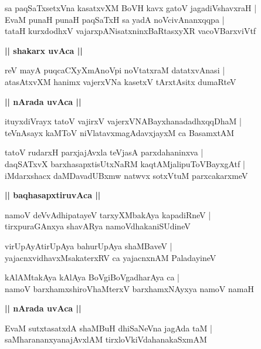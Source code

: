 \documentclass[twoside,12pt,openright]{book}
\newcounter{shloka}[chapter]
\def\uvaca#1{\centerline{{\large\textbf{#1}}}}
\begin{document}
\begin{shloka}%
sa paqSaTxsetxVna kasatxvXM BoVH kavx gatoV jagadiVshavxraH |\\
EvaM punaH punaH paqSaTxH sa yadA noVcivAnanxqqpa |\\
tataH kurxdodhxV vajarxpANisatxninxBaRtasxyXR vacoVBarxviVtf 
\end{shloka}

\uvaca{|| shakarx uvAca ||}

\begin{shloka}%
reV mayA puqcaCXyXmAnoVpi noVtatxraM datatxvAnasi |\\
atasAtxvXM hanimx vajerxVNa kasetxV tArxtAsitx dumaRteV 
\end{shloka}

\uvaca{|| nArada uvAca ||}

\begin{shloka}%
ituyxdiVrayx tatoV vajirxV vajerxVNABayxhanadadhxqqDhaM |\\
teVnAsayx kaMToV niVlatavxmagAdavxjayxM ca BasamxtAM 
\end{shloka}

\begin{shloka}%
tatoV rudarxH parxjajAvxla teVjasA parxdahaninxva |\\
daqSATxvX barxhasapxtisUtxNaRM kaqtAMjalipuToVBayxgAtf |\\
iMdarxshacx daMDavadUBxmw natwvx sotxVtuM parxcakarxmeV
\end{shloka}

\uvaca{|| baqhasapxtiruvAca ||}

\begin{shloka}%
namoV deVvAdhipatayeV tarxyXMbakAya kapadiRneV |\\
tirxpuraGAnxya shavARya namoVdhakaniSUdineV 
\end{shloka}

\begin{shloka}%
virUpAyAtirUpAya bahurUpAya shaMBaveV |\\
yajacnxvidhavxMsakaterxRV ca yajacnxnAM PaladayineV 
\end{shloka}

\begin{shloka}%
kAlAMtakAya kAlAya BoVgiBoVgadharAya ca |\\
namoV barxhamxshiroVhaMterxV barxhamxNAyxya namoV namaH 
\end{shloka}

\uvaca{|| nArada uvAca ||}

\begin{shloka}%
EvaM sutxtasatxdA shaMBuH dhiSaNeVna jagAda taM |\\
saMharananxyanajAvxlAM tirxloVkiVdahanakaSxmAM 
\end{shloka}
\end{document}
